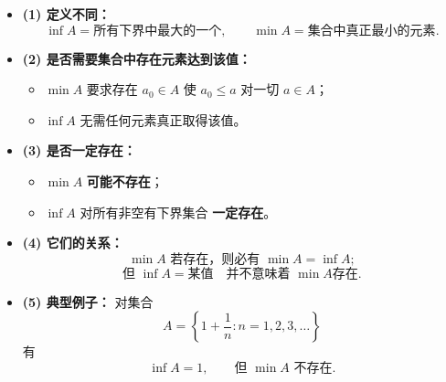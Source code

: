 \begin{itemize}
  \item \textbf{(1) 定义不同：}
  \[
  \inf A = \text{所有下界中最大的一个},\qquad
  \min A = \text{集合中真正最小的元素}.
  \]

  \item \textbf{(2) 是否需要集合中存在元素达到该值：}  
  \begin{itemize}
    \item $\min A$ 要求存在 $a_0\in A$ 使 $a_0\le a$ 对一切 $a\in A$；
    \item $\inf A$ 无需任何元素真正取得该值。
  \end{itemize}

  \item \textbf{(3) 是否一定存在：}  
  \begin{itemize}
    \item $\min A$ \textbf{可能不存在}；
    \item $\inf A$ 对所有非空有下界集合 \textbf{一定存在}。
  \end{itemize}

  \item \textbf{(4) 它们的关系：}
  \[
  \min A \text{ 若存在，则必有 } \min A = \inf A;
  \]
  \[
  \text{但 } \inf A = \text{某值} \quad\text{并不意味着 } \min A \text{存在}.
  \]

  \item \textbf{(5) 典型例子：}  
  对集合 
  \[
  A = \left\{1+\frac{1}{n} : n=1,2,3,\dots\right\}
  \]
  有
  \[
  \inf A = 1,\qquad \text{但 }\min A\text{ 不存在}.
  \]
\end{itemize}
